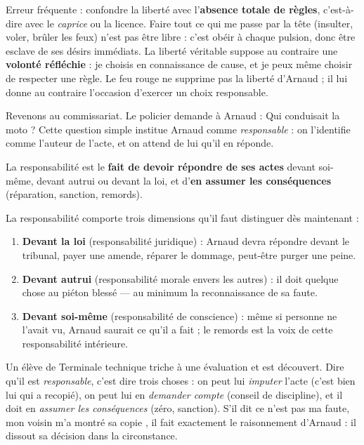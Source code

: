 \documentclass[11pt]{article}
\newcommand{\cle}[1]{{\popxbold\color{popdark}#1}}
\newcounter{popsec}
\newcounter{popsub}
\newcommand{\courssub}[1]{%
  \stepcounter{popsub}%
  \par\vspace{9pt}\noindent{\popxbold\fontsize{11.5}{13}\selectfont\color{popink}{\color{poporange}\thepopsec.\thepopsub}\hspace{6pt}#1}\par\nopagebreak\vspace{4pt}
}
\begin{document}
\begin{attention}
Erreur fréquente : confondre la liberté avec l'\textbf{absence totale de règles}, c'est-à-dire avec le \emph{caprice} ou la licence. Faire \og tout ce qui me passe par la tête \fg{} (insulter, voler, brûler les feux) n'est pas être libre : c'est obéir à chaque pulsion, donc être esclave de ses désirs immédiats. La liberté véritable suppose au contraire une \textbf{volonté réfléchie} : je choisis en connaissance de cause, et je peux même choisir de respecter une règle. Le feu rouge ne supprime pas la liberté d'Arnaud ; il lui donne au contraire l'occasion d'exercer un choix responsable.
\end{attention}

\courssub{Définition de la responsabilité}

Revenons au commissariat. Le policier demande à Arnaud : \og Qui conduisait la moto ? \fg{} Cette question simple institue Arnaud comme \emph{responsable} : on l'identifie comme l'auteur de l'acte, et on attend de lui qu'il en réponde.

\begin{definition}[La responsabilité]
La \cle{responsabilité} est le \textbf{fait de devoir répondre de ses actes} devant soi-même, devant autrui ou devant la loi, et d'\textbf{en assumer les conséquences} (réparation, sanction, remords).
\end{definition}

La responsabilité comporte trois dimensions qu'il faut distinguer dès maintenant :

\begin{enumerate}
\item \textbf{Devant la loi} (responsabilité juridique) : Arnaud devra répondre devant le tribunal, payer une amende, réparer le dommage, peut-être purger une peine.
\item \textbf{Devant autrui} (responsabilité morale envers les autres) : il doit quelque chose au piéton blessé — au minimum la reconnaissance de sa faute.
\item \textbf{Devant soi-même} (responsabilité de conscience) : même si personne ne l'avait vu, Arnaud saurait ce qu'il a fait ; le remords est la voix de cette responsabilité intérieure.
\end{enumerate}

\begin{exemplebox}
Un élève de Terminale technique triche à une évaluation et est découvert. Dire qu'il est \emph{responsable}, c'est dire trois choses : on peut lui \emph{imputer} l'acte (c'est bien lui qui a recopié), on peut lui en \emph{demander compte} (conseil de discipline), et il doit en \emph{assumer les conséquences} (zéro, sanction). S'il dit \og ce n'est pas ma faute, mon voisin m'a montré sa copie \fg{}, il fait exactement le raisonnement d'Arnaud : il dissout sa décision dans la circonstance.
\end{exemplebox}
\end{document}
